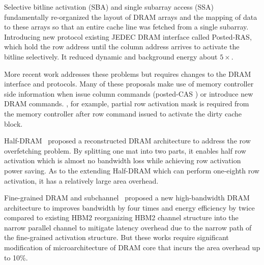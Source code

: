 Selective bitline activation (SBA) and single subarray access (SSA)~
fundamentally re-organized the layout of DRAM arrays and the mapping of data to these arrays so that an
entire cache line was fetched from a single subarray. Introducing new protocol existing JEDEC DRAM
interface called Posted-RAS, which hold the row address until the column address arrives to activate
the bitline selectively. It reduced dynamic and background energy about $5\times$.

More recent work addresses these problems but requires changes to the DRAM interface and protocols.
Many of these proposals make use of memory controller side information
when issue column commands (posted-CAS ) or introduce new DRAM commands. 
, for example, partial row activation mask is required
from the memory controller after row command issued to activate the dirty cache block.

Half-DRAM~ proposed a reconstructed DRAM architecture to address the row overfetching
problem. 
By splitting one mat into two parts, it enables half row activation which is almost no bandwidth
loss while achieving row activation power saving. As to the extending Half-DRAM which can perform
one-eighth row activation, it has a relatively large area overhead.

Fine-grained DRAM and subchannel~ proposed a new high-bandwidth
DRAM architecture to improves bandwidth by four times and energy efficiency by twice compared to existing
HBM2 reorganizing HBM2 channel structure into the narrow parallel channel to mitigate latency overhead 
due to the narrow path of the fine-grained activation structure. 
But these works require significant modification of microarchitecture of DRAM core that incurs 
the area overhead up to 10\%.

